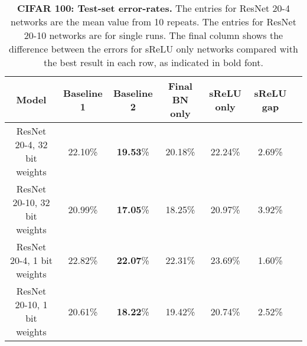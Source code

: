 \documentclass[conference]{IEEEtran}
\begin{document}
\begin{table*}[h]
\caption{{\bf CIFAR 100: Test-set error-rates.} The entries for ResNet 20-4 networks are the mean value from 10 repeats. The entries for ResNet 20-10 networks are for single runs. The final column shows the difference between the errors for sReLU only networks compared with the best result in each row, as indicated in bold font.}\label{Table01}
\begin{center}
\footnotesize
\begin{tabular}{|c|c|c|c|c|c|c}
\hline
{\bf Model} &{\bf Baseline 1} & {\bf Baseline 2} & {\bf Final BN only} & {\bf sReLU only}& {\bf sReLU gap}\\
\hline
ResNet 20-4, 32 bit weights & 22.10\%& {\bf 19.53}\% &20.18\% & 22.24\%& 2.69\%\\
\hline
ResNet 20-10, 32 bit weights & 20.99\%&{\bf 17.05}\% &18.25\% & 20.97\%& 3.92\%\\
\hline
\hline
ResNet 20-4, 1 bit weights & 22.82\%& {\bf 22.07}\%&{ 22.31}\% &23.69\% & 1.60\%\\
\hline
ResNet 20-10, 1 bit weights &20.61\% & {\bf 18.22}\%&19.42\% & 20.74\%& 2.52\%\\
\hline
\end{tabular}
\end{center}
\end{table*}
\end{document}
